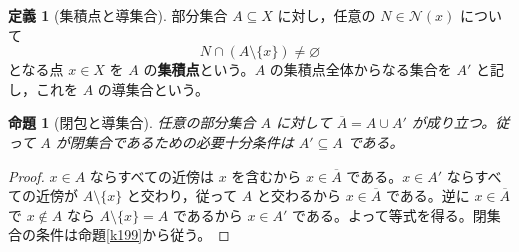 \documentclass[a5paper,10pt,dvipdfmx]{jsarticle}
\theoremstyle{definition}
\newtheorem{defn}[ruledef]{定義}
\theoremstyle{plain}
\newtheorem{prop}[ruledef]{命題}
\begin{document}
\begin{defn}[集積点と導集合]\label{k205}
部分集合 $A\subseteq X$ に対し，任意の $N\in\mathcal N(x)$ について
\[
 N\cap(A\setminus\{x\})\ne\varnothing
\]
となる点 $x\in X$ を $A$ の\textbf{集積点}という。$A$ の集積点全体からなる集合を $A'$ と記し，これを $A$ の導集合という。
\end{defn}
\begin{prop}[閉包と導集合]\label{k206}
任意の部分集合 $A$ に対して $\overline A=A\cup A'$ が成り立つ。従って $A$ が閉集合であるための必要十分条件は $A'\subseteq A$ である。
\end{prop}
\begin{proof}
$x\in A$ ならすべての近傍は $x$ を含むから $x\in\overline A$ である。$x\in A'$ ならすべての近傍が $A\setminus\{x\}$ と交わり，従って $A$ と交わるから $x\in\overline A$ である。逆に $x\in\overline A$ で $x\notin A$ なら $A\setminus\{x\}=A$ であるから $x\in A'$ である。よって等式を得る。閉集合の条件は命題\ref{k199}から従う。
\end{proof}
\end{document}
